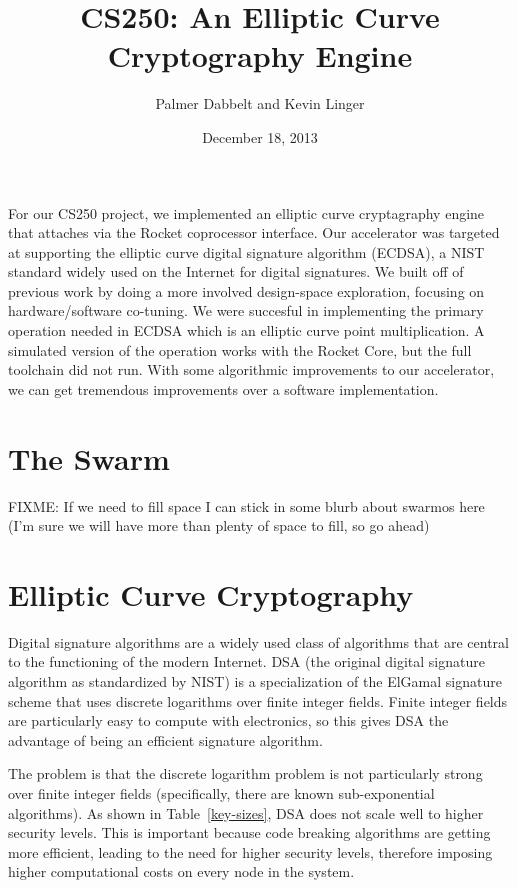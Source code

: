 \documentclass[twocolumn]{article}
\title{CS250: An Elliptic Curve Cryptography Engine}
\author{Palmer Dabbelt and Kevin Linger}
\date{December 18, 2013}
\begin{document}
\maketitle

For our CS250 project, we implemented an elliptic curve cryptagraphy
engine that attaches via the Rocket coprocessor interface.  Our
accelerator was targeted at supporting the elliptic curve digital
signature algorithm (ECDSA), a NIST standard widely used on the
Internet for digital signatures.  We built off of previous work by
doing a more involved design-space exploration, focusing on
hardware/software co-tuning. We were succesful in implementing the
primary operation needed in ECDSA which is an elliptic curve point 
multiplication. A simulated version of the operation works with the
Rocket Core, but the full toolchain did not run. With some algorithmic
improvements to our accelerator, we can get tremendous improvements
over a software implementation.

\section{The Swarm}

FIXME: If we need to fill space I can stick in some blurb about
swarmos here
(I'm sure we will have more than plenty of space to fill, so go ahead)

\section{Elliptic Curve Cryptography}

Digital signature algorithms\cite{fips-186-3} are a widely used class
of algorithms that are central to the functioning of the modern
Internet.  DSA\cite{us-dsa} (the original digital signature algorithm
as standardized by NIST) is a specialization of the ElGamal signature
scheme\cite{elgamal-sig} that uses discrete logarithms over finite
integer fields.  Finite integer fields are particularly easy to
compute with electronics, so this gives DSA the advantage of being an
efficient signature algorithm.

The problem is that the discrete logarithm problem is not particularly
strong over finite integer fields (specifically, there are known
sub-exponential algorithms\cite{adleman-subexp}).  As shown in
Table~\ref{key-sizes}, DSA does not scale well to higher security
levels.  This is important because code breaking algorithms are
getting more efficient, leading to the need for higher security
levels, therefore imposing higher computational costs on every node in
the system. 
\end{document}
